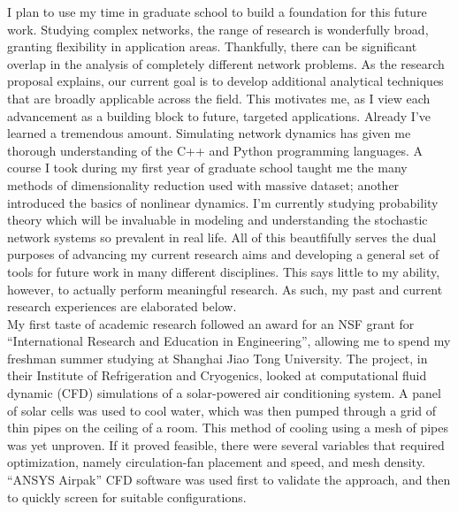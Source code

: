 \documentclass[11pt]{article}
\begin{document}
I plan to use my time in graduate school to build a foundation for this future work. Studying complex networks, the range of research is wonderfully broad, granting flexibility in application areas. Thankfully, there can be significant overlap in the analysis of completely different network problems. As the research proposal explains, our current goal is to develop additional analytical techniques that are broadly applicable across the field. This motivates me, as I view each advancement as a building block to future, targeted applications. Already I've learned a tremendous amount. Simulating network dynamics has given me thorough understanding of the C++ and Python programming languages. A course I took during my first year of graduate school taught me the many methods of dimensionality reduction used with massive dataset; another introduced the basics of nonlinear dynamics. I'm currently studying probability theory which will be invaluable in modeling and understanding the stochastic network systems so prevalent in real life. All of this beautfifully serves the dual purposes of advancing my current research aims and developing a general set of tools for future work in many different disciplines. This says little to my ability, however, to actually perform meaningful research. As such, my past and current research experiences are elaborated below.\\

My first taste of academic research followed an award for an NSF grant for “International Research and Education in Engineering”, allowing me to spend my freshman summer studying at Shanghai Jiao Tong University. The project, in their Institute of Refrigeration and Cryogenics, looked at computational fluid dynamic (CFD) simulations of a solar-powered air conditioning system. A panel of solar cells was used to cool water, which was then pumped through a grid of thin pipes on the ceiling of a room. This method of cooling using a mesh of pipes was yet unproven. If it proved feasible, there were several variables that required optimization, namely circulation-fan placement and speed, and mesh density. “ANSYS Airpak” CFD software was used first to validate the approach, and then to quickly screen for suitable configurations.\\
\end{document}
